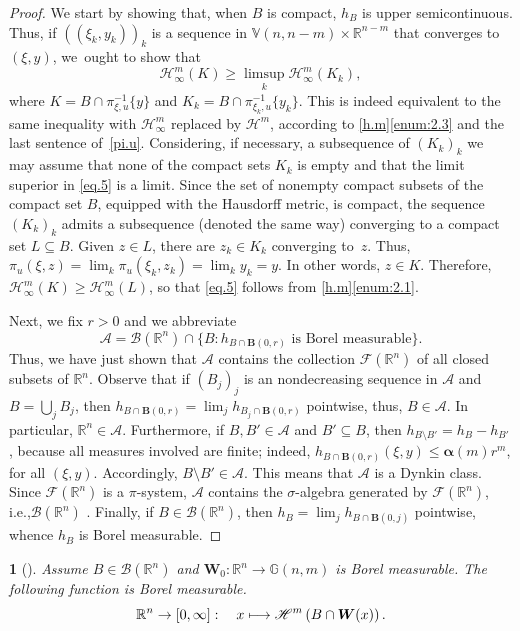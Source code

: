 \documentclass[11pt]{article}
\newcommand{\ie}{i.e.,\xspace}
\newcounter{cdrthm}[section]
\theoremstyle{definition}
\theoremstyle{jepanonymous}
\newtheorem{jepempty}[cdrthm]{}
\newenvironment{enonce}[2][remark]{\begin{jepempty}[#2]}{\end{jepempty}}
\theoremstyle{plain}
\newcommand\mto{\mathchoice{\longmapsto}{\mapsto}{\mapsto}{\mapsto}}
\newenvironment{Empty}[2][\null]{%
\begin{enonce}[remark]{#1}#2}
{\end{enonce}}
\newcommand{\R}{\mathbb{R}}
\newcommand{\Rn}{\R^n}
\newcommand{\calA}{\mathscr{A}}
\newcommand{\calB}{\mathscr{B}}
\newcommand{\calF}{\mathscr{F}}
\newcommand{\calH}{\mathscr{H}}
\newcommand{\balpha}{\boldsymbol{\alpha}}
\newcommand{\bB}{{\boldsymbol{B}}}
\newcommand{\bW}{{\boldsymbol{W}}}
\newcommand{\bV}{\mathbb{V}}
\newcommand{\bG}{\mathbb{G}}
\let\subset\subseteq
\begin{document}
\begin{proof}
We start by showing that, when $B$ is compact, $h_{B}$ is upper semicontinuous.
Thus, if $((\xi_k,y_k))_k$ is a sequence in $\bV(n,n-m) \times \R^{n-m}$ that converges to $(\xi,y)$, we~ought to show that
\begin{equation}
\label{eq.5}
\calH^m_\infty(K) \geq \limsup_k \calH^m_\infty(K_k),
\end{equation}
where $K = B \cap \pi_{\xi,u}^{-1}\{y\}$ and $K_k = B \cap \pi_{\xi_k,u}^{-1}\{y_k\}$.
This is indeed equivalent to the same inequality with $\calH^m_\infty$ replaced by $\calH^m$, according to \ref{h.m}\eqref{enum:2.3} and the last sentence of~\ref{pi.u}.
Considering, if necessary, a subsequence of $(K_k)_k$ we may assume that none of the compact sets $K_k$ is empty and that the limit superior in \eqref{eq.5} is a limit.
Since the set of nonempty compact subsets of the compact set $B$, equipped with the Hausdorff metric, is compact, the sequence $(K_k)_k$ admits a subsequence (denoted the same way) converging to a compact set $L \subset B$.
Given $z \in L$, there are $z_k \in K_k$ converging to~$z$.
Thus, $\pi_u(\xi,z) = \lim_k \pi_u(\xi_k,z_k) = \lim_k y_k = y$.
In other words, $z \in K$.
Therefore, $\calH^m_\infty(K) \geq \calH^m_\infty(L)$, so that \eqref{eq.5} follows from \ref{h.m}\eqref{enum:2.1}.
\par
Next, we fix $r > 0$ and we abbreviate
\[
\calA = \calB(\Rn) \cap \{ B: h_{B \cap \bB(0,r)} \text{ is Borel measurable}\}.
\]
Thus, we have just shown that $\calA$ contains the collection $\calF(\Rn)$ of all closed subsets of $\Rn$.
Observe that if $(B_j)_j$ is an nondecreasing sequence in $\calA$ and $B = \bigcup_j B_j$, then $h_{B \cap \bB(0,r)} = \lim_j h_{B_j \cap \bB(0,r)}$ pointwise, thus, $B \in \calA$.
In particular, $\Rn \in \calA$.
Furthermore, if $B,B' \in \calA$ and $B' \subset B$, then $h_{B \setminus B'} = h_{B} - h_{B'}$, because all measures involved are finite; indeed, $h_{B \cap \bB(0,r)}(\xi,y) \leq \balpha(m)r^m$, for all $(\xi,y)$.
Accordingly, \hbox{$B \setminus B' \in \calA$}.
This means that $\calA$ is a Dynkin class.
Since $\calF(\Rn)$ is a $\pi$-system, $\calA$ contains the $\sigma$-algebra generated by $\calF(\Rn)$, \ie $\calB(\Rn)$ \cite[Th.\,1.6.2]{COHN}.
Finally, if $B \in \calB(\Rn)$, then $h_B = \lim_j h_{B \cap \bB(0,j)}$ pointwise, whence $h_B$ is Borel measurable.
\end{proof}

\begin{Empty}[]
\label{second.measurability}
{\it
Assume $B \in \calB(\Rn)$ and $\bW_0: \Rn \to \bG(n,m)$ is Borel measurable. The fol\-low\-ing function is Borel measurable.
\begin{equation*}
\Rn \to [0,\infty]:\quad x \mto \calH^m\left(B \cap \bW(x) \right).
\end{equation*}
}
\end{Empty}
\end{document}
